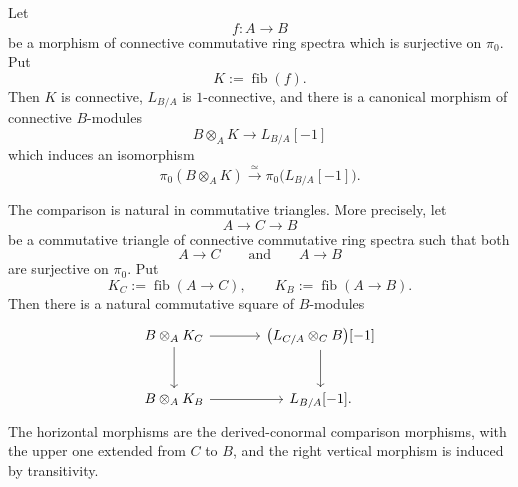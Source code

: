 \begin{theorem}
\label{thm:derived-conormal-comparison}
Let
\[
    f
    \colon
    A
    \longrightarrow
    B
\]
be a morphism of connective commutative ring spectra which is surjective
on \(\pi_0\). Put
\[
    K
    :=
    \operatorname{fib}(f).
\]
Then \(K\) is connective, \(L_{B/A}\) is \(1\)-connective, and there is a
canonical morphism of connective \(B\)-modules
\[
    B\otimes_AK
    \longrightarrow
    L_{B/A}[-1]
\]
which induces an isomorphism
\[
    \pi_0(B\otimes_AK)
    \xrightarrow{\simeq}
    \pi_0
    \bigl(
        L_{B/A}[-1]
    \bigr).
\]

The comparison is natural in commutative triangles. More precisely, let
\[
    A
    \longrightarrow
    C
    \longrightarrow
    B
\]
be a commutative triangle of connective commutative ring spectra such
that both
\[
    A
    \longrightarrow
    C
    \qquad\text{and}\qquad
    A
    \longrightarrow
    B
\]
are surjective on \(\pi_0\). Put
\[
    K_C
    :=
    \operatorname{fib}(A\to C),
    \qquad
    K_B
    :=
    \operatorname{fib}(A\to B).
\]
Then there is a natural commutative square of \(B\)-modules
\[
\begin{tikzcd}[column sep=large, row sep=large]
    B\otimes_AK_C
        \arrow[r]
        \arrow[d]
    &
    \bigl(
        L_{C/A}\otimes_CB
    \bigr)[-1]
        \arrow[d]
    \\
    B\otimes_AK_B
        \arrow[r]
    &
    L_{B/A}[-1].
\end{tikzcd}
\]
The horizontal morphisms are the derived-conormal comparison morphisms,
with the upper one extended from \(C\) to \(B\), and the right vertical
morphism is induced by transitivity.
\end{theorem}


